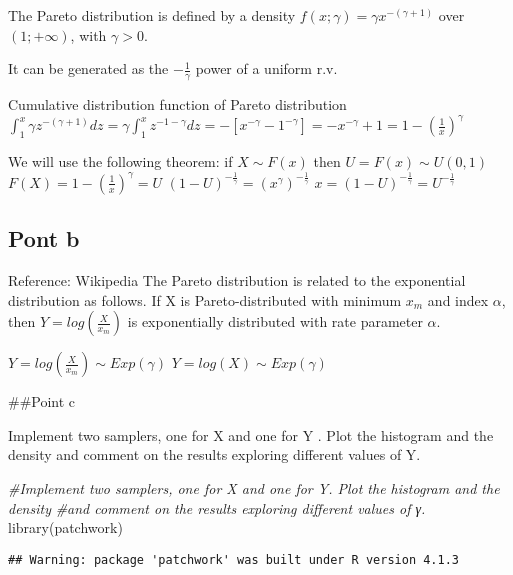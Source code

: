 \documentclass[
]{article}
\newenvironment{Shaded}{\begin{snugshade}}{\end{snugshade}}
\newcommand{\CommentTok}[1]{\textcolor[rgb]{0.56,0.35,0.01}{\textit{#1}}}
\newcommand{\FunctionTok}[1]{\textcolor[rgb]{0.00,0.00,0.00}{#1}}
\newcommand{\NormalTok}[1]{#1}
\begin{document}
The Pareto distribution is defined by a density
\(f(x;\gamma)=\gamma x^{-(\gamma +1)}\) over \((1;+\infty)\), with
\(\gamma >0\).

It can be generated as the \(-\frac{1}{\gamma}\) power of a uniform r.v.

Cumulative distribution function of Pareto distribution
\(\int_1^x \gamma z^{-(\gamma +1)} dz= \gamma \int_1^x z^{-1-\gamma}dz=-[x^{-\gamma}-1^{-\gamma}]=-x^{-\gamma}+1=1-(\frac{1}{x})^{\gamma}\)

We will use the following theorem: if \(X \sim F(x)\) then
\(U=F(x) \sim U(0,1)\) \(F(X)=1-(\frac{1}{x})^{\gamma}=U\)
\((1-U)^{-\frac{1}{\gamma}}=(x^{\gamma})^{-\frac{1}{\gamma}}\)
\(x=(1-U)^{-\frac{1}{\gamma}}=U^{-\frac{1}{\gamma}}\)

\hypertarget{pont-b}{%
\subsection{Pont b}\label{pont-b}}

Reference: Wikipedia The Pareto distribution is related to the
exponential distribution as follows. If X is Pareto-distributed with
minimum \(x_m\) and index \(\alpha\), then \(Y=log(\frac{X}{x_m})\) is
exponentially distributed with rate parameter \(\alpha\).

\(Y=log(\frac{X}{x_m}) \sim Exp(\gamma)\) \(Y=log(X) \sim Exp(\gamma)\)

\#\#Point c

Implement two samplers, one for X and one for Y . Plot the histogram and
the density and comment on the results exploring different values of Y.

\begin{Shaded}
\begin{Highlighting}[]
\CommentTok{\#Implement two samplers, one for X and one for Y. Plot the histogram and the density}
\CommentTok{\#and comment on the results exploring different values of γ.}
\FunctionTok{library}\NormalTok{(patchwork)}
\end{Highlighting}
\end{Shaded}

\begin{verbatim}
## Warning: package 'patchwork' was built under R version 4.1.3
\end{verbatim}
\end{document}
